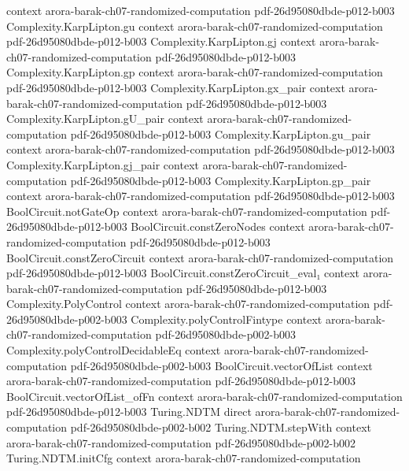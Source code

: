 \begin{theorem}
  {context}
  {arora-barak-ch07-randomized-computation}
  {pdf-26d95080dbde-p012-b003}
\proofstep
  {Complexity.KarpLipton.gu}
  {context}
  {arora-barak-ch07-randomized-computation}
  {pdf-26d95080dbde-p012-b003}
\proofstep
  {Complexity.KarpLipton.gj}
  {context}
  {arora-barak-ch07-randomized-computation}
  {pdf-26d95080dbde-p012-b003}
\proofstep
  {Complexity.KarpLipton.gp}
  {context}
  {arora-barak-ch07-randomized-computation}
  {pdf-26d95080dbde-p012-b003}
\proofstep
  {Complexity.KarpLipton.gx_pair}
  {context}
  {arora-barak-ch07-randomized-computation}
  {pdf-26d95080dbde-p012-b003}
\proofstep
  {Complexity.KarpLipton.gU_pair}
  {context}
  {arora-barak-ch07-randomized-computation}
  {pdf-26d95080dbde-p012-b003}
\proofstep
  {Complexity.KarpLipton.gu_pair}
  {context}
  {arora-barak-ch07-randomized-computation}
  {pdf-26d95080dbde-p012-b003}
\proofstep
  {Complexity.KarpLipton.gj_pair}
  {context}
  {arora-barak-ch07-randomized-computation}
  {pdf-26d95080dbde-p012-b003}
\proofstep
  {Complexity.KarpLipton.gp_pair}
  {context}
  {arora-barak-ch07-randomized-computation}
  {pdf-26d95080dbde-p012-b003}
\proofstep
  {BoolCircuit.notGateOp}
  {context}
  {arora-barak-ch07-randomized-computation}
  {pdf-26d95080dbde-p012-b003}
\proofstep
  {BoolCircuit.constZeroNodes}
  {context}
  {arora-barak-ch07-randomized-computation}
  {pdf-26d95080dbde-p012-b003}
\proofstep
  {BoolCircuit.constZeroCircuit}
  {context}
  {arora-barak-ch07-randomized-computation}
  {pdf-26d95080dbde-p012-b003}
\proofstep
  {BoolCircuit.constZeroCircuit_eval₁}
  {context}
  {arora-barak-ch07-randomized-computation}
  {pdf-26d95080dbde-p012-b003}
\proofstep
  {Complexity.PolyControl}
  {context}
  {arora-barak-ch07-randomized-computation}
  {pdf-26d95080dbde-p002-b003}
\proofstep
  {Complexity.polyControlFintype}
  {context}
  {arora-barak-ch07-randomized-computation}
  {pdf-26d95080dbde-p002-b003}
\proofstep
  {Complexity.polyControlDecidableEq}
  {context}
  {arora-barak-ch07-randomized-computation}
  {pdf-26d95080dbde-p002-b003}
\proofstep
  {BoolCircuit.vectorOfList}
  {context}
  {arora-barak-ch07-randomized-computation}
  {pdf-26d95080dbde-p012-b003}
\proofstep
  {BoolCircuit.vectorOfList_ofFn}
  {context}
  {arora-barak-ch07-randomized-computation}
  {pdf-26d95080dbde-p012-b003}
\proofstep
  {Turing.NDTM}
  {direct}
  {arora-barak-ch07-randomized-computation}
  {pdf-26d95080dbde-p002-b002}
\proofstep
  {Turing.NDTM.stepWith}
  {context}
  {arora-barak-ch07-randomized-computation}
  {pdf-26d95080dbde-p002-b002}
\proofstep
  {Turing.NDTM.initCfg}
  {context}
  {arora-barak-ch07-randomized-computation}

\end{theorem}
